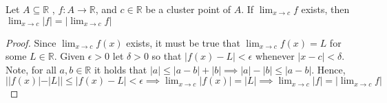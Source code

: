 \documentclass[12pt]{article}
\newcommand{\R}{\mathbb{R}}
\newenvironment{claim}[2][Claim]{\begin{trivlist}
		\item[\hskip \labelsep {\bfseries #1}\hskip \labelsep {\bfseries #2}]}{\end{trivlist}}
\begin{document}
\begin{claim}{4.2.14}
	Let $A \subseteq \R$ , $f:A \rightarrow \R$, and $c \in \R$ be a cluster point of $A$. If $\lim_{x \rightarrow c} f$ exists, then $\lim_{x \rightarrow c} |f| = \left | \lim_{x \rightarrow c} f \right |$
\end{claim}
\begin{proof}
	Since $\lim_{x \rightarrow c} f(x)$ exists, it must be true that $\lim_{x \rightarrow c} f(x) = L$ for some $L \in \R$.
	Given $\epsilon > 0$ let $\delta > 0$ so that $|f(x) - L| < \epsilon$ whenever $|x -c| < \delta $.
	Note, for all $a,b \in \R$ it holds that $|a| \leq |a - b| +  |b| \implies |a| - |b| \leq |a - b|$.  
	Hence, $| |f(x) | - |L| | \leq |f(x) - L | < \epsilon \implies \lim_{x \rightarrow c} |f(x)| = |L| \implies \lim_{x \rightarrow c} |f| = | \lim_{x \rightarrow c} f|$ 
\end{proof}
\end{document}

